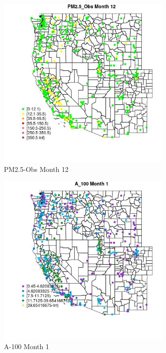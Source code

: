 \begin{figure} 
\centering  
\includegraphics[width=0.77\textwidth]{Code_Outputs/ML_input_report_ML_input_PM25_Step5_part_d_de_duplicated_aves_ML_input_MapObsMo12PM25_Obs.jpg} 
\caption{\label{fig:ML_input_report_ML_input_PM25_Step5_part_d_de_duplicated_aves_ML_inputMapObsMo12PM25_Obs}PM2.5-Obs Month 12} 
\end{figure} 
 

\begin{figure} 
\centering  
\includegraphics[width=0.77\textwidth]{Code_Outputs/ML_input_report_ML_input_PM25_Step5_part_d_de_duplicated_aves_ML_input_MapObsMo1A_100.jpg} 
\caption{\label{fig:ML_input_report_ML_input_PM25_Step5_part_d_de_duplicated_aves_ML_inputMapObsMo1A_100}A-100 Month 1} 
\end{figure} 
 

